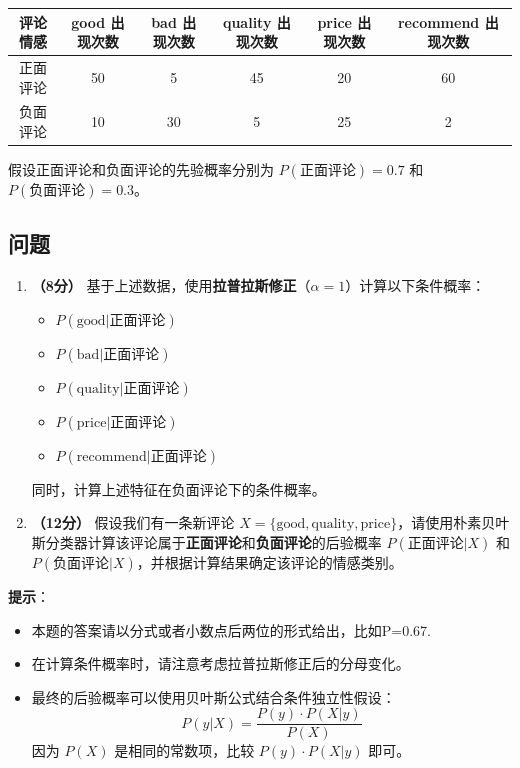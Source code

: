 \documentclass[8pt]{article}
\begin{document}
\begin{table}[h!]\small
    \centering
    \begin{tabular}{|c|c|c|c|c|c|}
        \hline
        评论情感 & good 出现次数 & bad 出现次数 & quality 出现次数 & price 出现次数 & recommend 出现次数 \\
        \hline
        正面评论 & 50 & 5 & 45 & 20 & 60 \\
        \hline
        负面评论 & 10 & 30 & 5 & 25 & 2 \\
        \hline
    \end{tabular}
\end{table}

假设正面评论和负面评论的先验概率分别为 \( P(\text{正面评论}) = 0.7 \) 和 \( P(\text{负面评论}) = 0.3 \)。

\subsection*{问题}

\begin{enumerate}
    \item \textbf{（8分）} 基于上述数据，使用\textbf{拉普拉斯修正}（\(\alpha = 1\)）计算以下条件概率：
        \begin{itemize}
            \item \( P(\text{good} | \text{正面评论}) \)
            \item \( P(\text{bad} | \text{正面评论}) \)
            \item \( P(\text{quality} | \text{正面评论}) \)
            \item \( P(\text{price} | \text{正面评论}) \)
            \item \( P(\text{recommend} | \text{正面评论}) \)
        \end{itemize}
    同时，计算上述特征在负面评论下的条件概率。

    \item \textbf{（12分）} 假设我们有一条新评论 \( X = \{\text{good}, \text{quality}, \text{price}\} \)，请使用朴素贝叶斯分类器计算该评论属于\textbf{正面评论}和\textbf{负面评论}的后验概率 \( P(\text{正面评论} | X) \) 和 \( P(\text{负面评论} | X) \)，并根据计算结果确定该评论的情感类别。
\end{enumerate}

\textbf{提示}：
\begin{itemize}
    \item 本题的答案请以分式或者小数点后两位的形式给出，比如P=0.67.
    \item 在计算条件概率时，请注意考虑拉普拉斯修正后的分母变化。
    \item 最终的后验概率可以使用贝叶斯公式结合条件独立性假设：
    \[
    P(y|X) = \frac{P(y) \cdot P(X|y)}{P(X)}
    \]
    因为 \( P(X) \) 是相同的常数项，比较 \( P(y) \cdot P(X|y) \) 即可。
\end{itemize}
\end{document}
